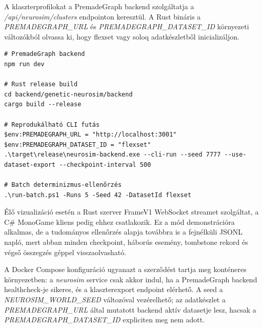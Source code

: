 A klaszterprofilokat a PremadeGraph backend szolgáltatja a
\textit{/api/neurosim/clusters} endpointon keresztül. A Rust bináris a
\textit{PREMADEGRAPH\_URL} és \textit{PREMADEGRAPH\_DATASET\_ID} környezeti
változókból olvassa ki, hogy flexset vagy soloq adatkészletből inicializáljon.

\begin{lstlisting}[language={},basicstyle=\ttfamily\scriptsize,breaklines=true,caption={Egy helyre gyűjtött fejlesztői futtatási parancsok}]
# PremadeGraph backend
npm run dev

# Rust release build
cd backend/genetic-neurosim/backend
cargo build --release

# Reprodukálható CLI futás
$env:PREMADEGRAPH_URL = "http://localhost:3001"
$env:PREMADEGRAPH_DATASET_ID = "flexset"
.\target\release\neurosim-backend.exe --cli-run --seed 7777 --use-dataset-export --checkpoint-interval 500

# Batch determinizmus-ellenőrzés
.\run-batch.ps1 -Runs 5 -Seed 42 -DatasetId flexset
\end{lstlisting}

Élő vizualizáció esetén a Rust szerver FrameV1 WebSocket streamet szolgáltat,
a C\# MonoGame kliens pedig ehhez csatlakozik. Ez a mód demonstrációra alkalmas,
de a tudományos ellenőrzés alapja továbbra is a fejnélküli JSONL napló, mert abban
minden checkpoint, háborús esemény, tombstone rekord és végső összegzés
géppel visszaolvasható.

A Docker Compose konfiguráció ugyanazt a szerződést tartja meg konténeres környezetben:
a \textit{neurosim} service csak akkor indul, ha a PremadeGraph backend healthcheck-je
sikeres, és a klaszterexport endpoint elérhető.
A seed a \textit{NEUROSIM\_WORLD\_SEED} változóval vezérelhető;
az adatkészlet a \textit{PREMADEGRAPH\_URL} által mutatott backend aktív datasetje lesz,
hacsak a \textit{PREMADEGRAPH\_DATASET\_ID} expliciten meg nem adott.

\bigskip
